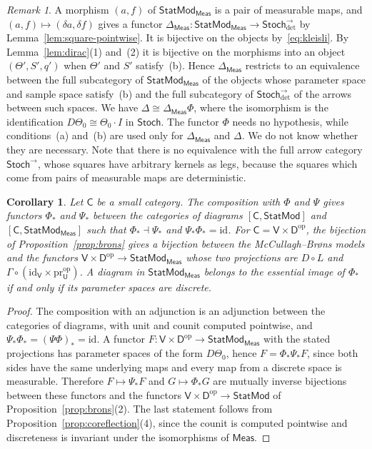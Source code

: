 \documentclass[11pt,a4paper]{article}
\theoremstyle{plain}
\newtheorem{corollary}[theorem]{Corollary}
\theoremstyle{definition}
\theoremstyle{remark}
\newtheorem{remark}[theorem]{Remark}
\newcommand{\cat}[1]{\mathsf{#1}}
\newcommand{\catU}{\cat{U}}
\newcommand{\catV}{\cat{V}}
\newcommand{\catD}{\cat{D}}
\newcommand{\Meas}{\cat{Meas}}
\newcommand{\Stoch}{\cat{Stoch}}
\newcommand{\op}{\mathrm{op}}
\newcommand{\id}{\mathrm{id}}
\newcommand{\pr}{\mathrm{pr}}
\newcommand{\del}{\delta}
\newcommand{\StatMod}{\cat{StatMod}}
\newcommand{\Statk}{\StatMod_{\Meas}}
\newcommand{\Jc}{\Delta}
\newcommand{\Jcm}{\Delta_{\Meas}}
\newcommand{\Arrdet}[1]{#1^{\rightarrow}_{\det}}
\begin{document}
\begin{remark}\label{rem:Jcm}
A morphism $(a,f)$ of $\Statk$ is a pair of measurable maps, and
$(a,f) \mapsto (\del a, \del f)$ gives a functor
$\Jcm \colon \Statk \to \Arrdet{\Stoch}$ by
Lemma~\ref{lem:square-pointwise}. It is bijective on the objects
by~\eqref{eq:kleisli}. By Lemma~\ref{lem:dirac}(1) and~(2) it is bijective on
the morphisms into an object $(\Theta',S',q')$ when $\Theta'$ and $S'$
satisfy~(b). Hence $\Jcm$ restricts to an equivalence between the full
subcategory of $\Statk$ of the objects whose parameter space and sample space
satisfy~(b) and the full subcategory of $\Arrdet{\Stoch}$ of the arrows between
such spaces. We have $\Jc \cong \Jcm\Phi$, where the isomorphism is the
identification $D\Theta_0 \cong \Theta_0 \cdot I$ in $\Stoch$. The functor
$\Phi$ needs no hypothesis, while conditions~(a) and~(b) are used only for
$\Jcm$ and $\Jc$. We do not know whether they are necessary. Note that there is
no equivalence with the full arrow category $\Stoch^{\rightarrow}$, whose
squares have arbitrary kernels as legs, because the squares which come from
pairs of measurable maps are deterministic.
\end{remark}

\begin{corollary}\label{cor:coreflection-diagrams}
Let $\cat{C}$ be a small category. The composition with $\Phi$ and $\Psi$ gives
functors $\Phi_{*}$ and $\Psi_{*}$ between the categories of diagrams
$[\cat{C}, \StatMod]$ and $[\cat{C}, \Statk]$ such that
$\Phi_{*} \dashv \Psi_{*}$ and $\Psi_{*}\Phi_{*} = \id$. For
$\cat{C} = \catV \times \catD^{\op}$, the bijection of
Proposition~\ref{prop:brons} gives a bijection between the McCullagh--Br\o ns
models and the functors $\catV \times \catD^{\op} \to \Statk$ whose two
projections are $D \circ L$ and
$\Gamma \circ (\id_{\catV} \times \pr_\catU^{\op})$. A diagram in $\Statk$
belongs to the essential image of $\Phi_{*}$ if and only if its parameter
spaces are discrete.
\end{corollary}

\begin{proof}
The composition with an adjunction is an adjunction between the categories of
diagrams, with unit and counit computed pointwise, and
$\Psi_{*}\Phi_{*} = (\Psi\Phi)_{*} = \id$. A functor
$F \colon \catV \times \catD^{\op} \to \Statk$ with the stated projections has
parameter spaces of the form $D\Theta_0$, hence $F = \Phi_{*}\Psi_{*}F$, since
both sides have the same underlying maps and every map from a discrete space
is measurable. Therefore $F \mapsto \Psi_{*}F$ and $G \mapsto \Phi_{*}G$ are
mutually inverse bijections between these functors and the functors
$\catV \times \catD^{\op} \to \StatMod$ of Proposition~\ref{prop:brons}(2). The
last statement follows from Proposition~\ref{prop:coreflection}(4), since the
counit is computed pointwise and discreteness is invariant under the
isomorphisms of $\Meas$.
\end{proof}



\end{document}
